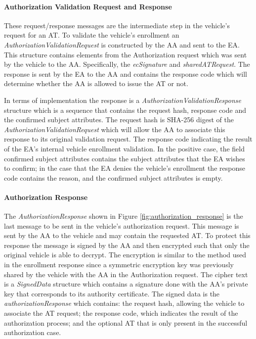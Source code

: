 \paragraph{Authorization Validation Request and Response}
These request/response messages are the intermediate step in the vehicle's request for an AT. To validate the vehicle's enrollment an \textit{AuthorizationValidationRequest} is constructed by the AA and sent to the EA. This structure contains elements from the Authorization request which was sent by the vehicle to the AA. Specifically, the \textit{ecSignature} and \textit{sharedATRequest}. The response is sent by the EA to the AA and contains the response code which will determine whether the AA is allowed to issue the AT or not. 

In terms of implementation the response is a \textit{AuthorizationValidationResponse} structure which is a sequence that contains the request hash, response code and the confirmed subject attributes. The request hash is SHA-256 digest of the \textit{AuthorizationValidationRequest} which will allow the AA to associate this response to its original validation request. The response code indicating the result of the EA's internal vehicle enrollment validation. In the positive case, the field confirmed subject attributes contains the subject attributes that the EA wishes to confirm; in the case that the EA denies the vehicle's enrollment the response code contains the reason, and the confirmed subject attributes is empty.

\paragraph{Authorization Response}
The \textit{AuthorizationResponse} shown in Figure \ref{fig:authorization_response} is the last message to be sent in the vehicle's authorization request. This message is sent by the AA to the vehicle and may contain the requested AT. To protect this response the message is signed by the AA and then encrypted such that only the original vehicle is able to decrypt. The encryption is similar to the method used in the enrollment response since a symmetric encryption key was previously shared by the vehicle with the AA in the Authorization request. The cipher text is a \textit{SignedData} structure which contains a signature done with the AA's private key that corresponds to its authority certificate. The signed data is the \textit{authorizationResponse} which contains: the request hash, allowing the vehicle to associate the AT request; the response code, which indicates the result of the authorization process; and the optional AT that is only present in the successful authorization case.
 
